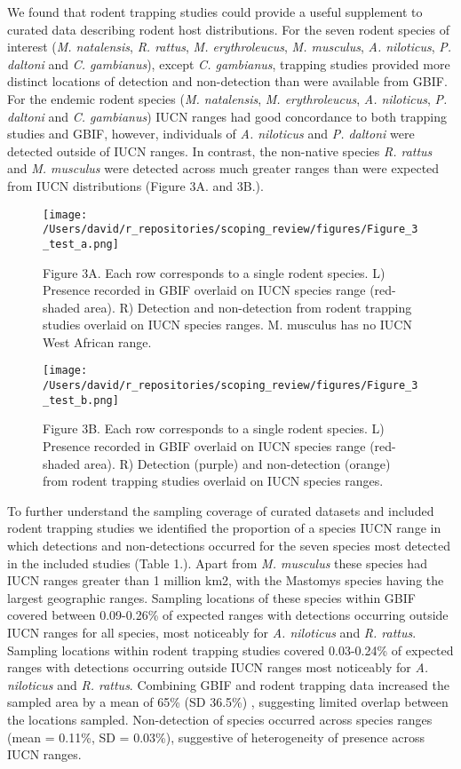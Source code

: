\documentclass[
]{article}
\begin{document}
We found that rodent trapping studies could provide a useful supplement
to curated data describing rodent host distributions. For the seven
rodent species of interest (\emph{M. natalensis}, \emph{R. rattus},
\emph{M. erythroleucus}, \emph{M. musculus}, \emph{A. niloticus},
\emph{P. daltoni} and \emph{C. gambianus}), except \emph{C. gambianus},
trapping studies provided more distinct locations of detection and
non-detection than were available from GBIF. For the endemic rodent
species (\emph{M. natalensis}, \emph{M. erythroleucus}, \emph{A.
niloticus}, \emph{P. daltoni} and \emph{C. gambianus}) IUCN ranges had
good concordance to both trapping studies and GBIF, however, individuals
of \emph{A. niloticus} and \emph{P. daltoni} were detected outside of
IUCN ranges. In contrast, the non-native species \emph{R. rattus} and
\emph{M. musculus} were detected across much greater ranges than were
expected from IUCN distributions (Figure 3A. and 3B.).

\begin{figure}
\centering
\texttt{[image: /Users/david/r\_repositories/scoping\_review/figures/Figure\_3\_test\_a.png]}
\caption{Figure 3A. Each row corresponds to a single rodent species. L)
Presence recorded in GBIF overlaid on IUCN species range (red-shaded
area). R) Detection and non-detection from rodent trapping studies
overlaid on IUCN species ranges. M. musculus has no IUCN West African
range.}
\end{figure}

\begin{figure}
\centering
\texttt{[image: /Users/david/r\_repositories/scoping\_review/figures/Figure\_3\_test\_b.png]}
\caption{Figure 3B. Each row corresponds to a single rodent species. L)
Presence recorded in GBIF overlaid on IUCN species range (red-shaded
area). R) Detection (purple) and non-detection (orange) from rodent
trapping studies overlaid on IUCN species ranges.}
\end{figure}

To further understand the sampling coverage of curated datasets and
included rodent trapping studies we identified the proportion of a
species IUCN range in which detections and non-detections occurred for
the seven species most detected in the included studies (Table 1.).
Apart from \emph{M. musculus} these species had IUCN ranges greater than
1 million km2, with the Mastomys species having the largest geographic
ranges. Sampling locations of these species within GBIF covered between
0.09-0.26\% of expected ranges with detections occurring outside IUCN
ranges for all species, most noticeably for \emph{A. niloticus} and
\emph{R. rattus}. Sampling locations within rodent trapping studies
covered 0.03-0.24\% of expected ranges with detections occurring outside
IUCN ranges most noticeably for \emph{A. niloticus} and \emph{R.
rattus}. Combining GBIF and rodent trapping data increased the sampled
area by a mean of 65\% (SD 36.5\%) , suggesting limited overlap between
the locations sampled. Non-detection of species occurred across species
ranges (mean = 0.11\%, SD = 0.03\%), suggestive of heterogeneity of
presence across IUCN ranges.
\end{document}
